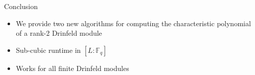 \documentclass{beamer}
\newcommand{\f}{\mathbb{F}}
\begin{document}













    


\begin{frame}{Conclusion}

\begin{itemize}
    \item We provide two new algorithms for computing the characteristic polynomial of a rank-2 Drinfeld module
    \item Sub-cubic runtime in $[L:\f_q]$
    \item Works for all finite Drinfeld modules
\end{itemize}
    
\end{frame}
\end{document}
